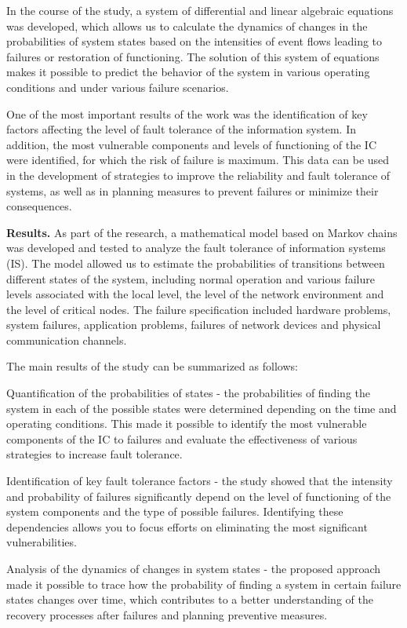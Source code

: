 In the course of the study, a system of differential and linear
algebraic equations was developed, which allows us to calculate the
dynamics of changes in the probabilities of system states based on the
intensities of event flows leading to failures or restoration of
functioning. The solution of this system of equations makes it possible
to predict the behavior of the system in various operating conditions
and under various failure scenarios.

One of the most important results of the work was the identification of
key factors affecting the level of fault tolerance of the information
system. In addition, the most vulnerable components and levels of
functioning of the IC were identified, for which the risk of failure is
maximum. This data can be used in the development of strategies to
improve the reliability and fault tolerance of systems, as well as in
planning measures to prevent failures or minimize their consequences.

\textbf{Results.} As part of the research, a mathematical model based on
Markov chains was developed and tested to analyze the fault tolerance of
information systems (IS). The model allowed us to estimate the
probabilities of transitions between different states of the system,
including normal operation and various failure levels associated with
the local level, the level of the network environment and the level of
critical nodes. The failure specification included hardware problems,
system failures, application problems, failures of network devices and
physical communication channels.

The main results of the study can be summarized as follows:

Quantification of the probabilities of states - the probabilities of
finding the system in each of the possible states were determined
depending on the time and operating conditions. This made it possible to
identify the most vulnerable components of the IC to failures and
evaluate the effectiveness of various strategies to increase fault
tolerance.

Identification of key fault tolerance factors - the study showed that
the intensity and probability of failures significantly depend on the
level of functioning of the system components and the type of possible
failures. Identifying these dependencies allows you to focus efforts on
eliminating the most significant vulnerabilities.

Analysis of the dynamics of changes in system states - the proposed
approach made it possible to trace how the probability of finding a
system in certain failure states changes over time, which contributes to
a better understanding of the recovery processes after failures and
planning preventive measures.

